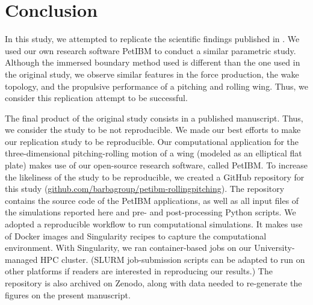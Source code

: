 \section{Conclusion}

In this study, we attempted to replicate the scientific findings published in \citet{li_dong_2016}.
We used our own research software PetIBM\cite{chuang_et_al_2018} to conduct a similar parametric study.
Although the immersed boundary method used is different than the one used in the original study, we observe similar features in the force production, the wake topology, and the propulsive performance of a pitching and rolling wing.
Thus, we consider this replication attempt to be successful.

The final product of the original study consists in a published manuscript.
Thus, we consider the study to be not reproducible.
We made our best efforts to make our replication study to be reproducible.
Our computational application for the three-dimensional pitching-rolling motion of a wing (modeled as an elliptical flat plate) makes use of our open-source research software, called PetIBM.\cite{chuang_et_al_2018}
To increase the likeliness of the study to be reproducible, we created a GitHub repository for this study (\url{github.com/barbagroup/petibm-rollingpitching}).
The repository contains the source code of the PetIBM applications, as well as all input files of the simulations reported here and pre- and post-processing Python scripts.
We adopted a reproducible workflow to run computational simulations.
It makes use of Docker images and Singularity recipes to capture the computational environment.
With Singularity, we ran container-based jobs on our University-managed HPC cluster.
(SLURM job-submission scripts can be adapted to run on other platforms if readers are interested in reproducing our results.)
The repository is also archived on Zenodo, along with data needed to re-generate the figures on the present manuscript.
